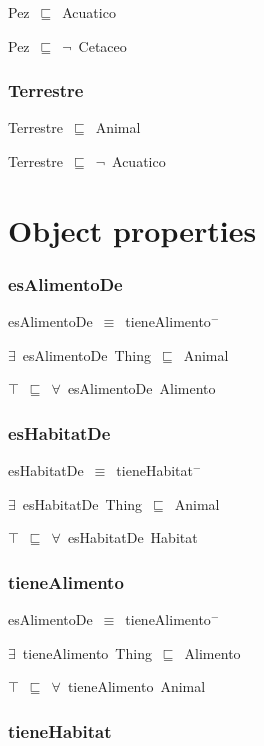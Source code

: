 Pez~\ensuremath{\sqsubseteq}~Acuatico~

Pez~\ensuremath{\sqsubseteq}~\ensuremath{\lnot}~Cetaceo

\subsubsection*{Terrestre}

Terrestre~\ensuremath{\sqsubseteq}~Animal~

Terrestre~\ensuremath{\sqsubseteq}~\ensuremath{\lnot}~Acuatico

\section*{Object properties}\subsubsection*{esAlimentoDe}

esAlimentoDe~\ensuremath{\equiv}~tieneAlimento\ensuremath{^-}

\ensuremath{\exists}~esAlimentoDe~Thing~\ensuremath{\sqsubseteq}~Animal

\ensuremath{\top}~\ensuremath{\sqsubseteq}~\ensuremath{\forall}~esAlimentoDe~Alimento

\subsubsection*{esHabitatDe}

esHabitatDe~\ensuremath{\equiv}~tieneHabitat\ensuremath{^-}

\ensuremath{\exists}~esHabitatDe~Thing~\ensuremath{\sqsubseteq}~Animal

\ensuremath{\top}~\ensuremath{\sqsubseteq}~\ensuremath{\forall}~esHabitatDe~Habitat

\subsubsection*{tieneAlimento}

esAlimentoDe~\ensuremath{\equiv}~tieneAlimento\ensuremath{^-}

\ensuremath{\exists}~tieneAlimento~Thing~\ensuremath{\sqsubseteq}~Alimento

\ensuremath{\top}~\ensuremath{\sqsubseteq}~\ensuremath{\forall}~tieneAlimento~Animal

\subsubsection*{tieneHabitat}

